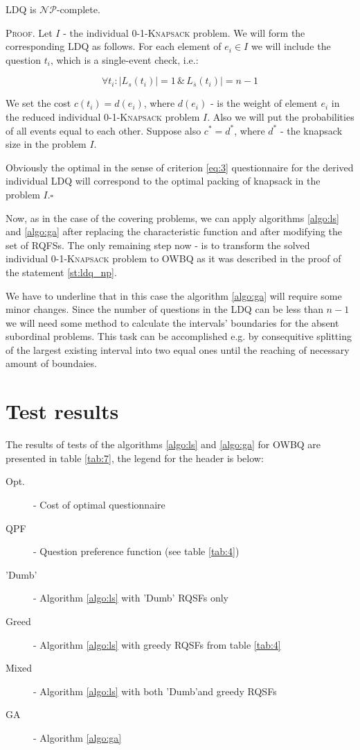 \documentclass[11pt]{article}
\begin{document}
\begin{Mystat} 
LDQ is $\mathcal{NP}$-complete.
\end{Mystat}\label{st:ldq_np}
{\scshape Proof}. Let $I$ - the individual \textsc{0-1-Knapsack} problem. We will form the corresponding LDQ as follows. For each element of $e_i \in I$ we will include the question $t_i$, which is a single-event check, i.e.:

\begin{equation}
\forall t_i : |L_s(t_i)|=1\,\&\,L_{\bar s}(t_i)\mid=n-1 \label{eq:4}
\end{equation}

We set the cost $c(t_i)=d(e_i)$, where $d(e_i)$ - is the weight of element $e_i$ in the reduced individual \textsc{0-1-Knapsack} problem $I$. Also we will put the probabilities of all events equal to each other. Suppose also $c^*=d^*$, where $d^*$ - the knapsack size in the problem $I$.

Obviously the optimal in the sense of criterion \ref{eq:3} questionnaire for the derived individual LDQ will correspond to the optimal packing of knapsack in the problem $I$.$\square$

Now, as in the case of the covering problems, we can apply algorithms \ref{algo:ls} and \ref{algo:ga} after replacing the characteristic function and after modifying the set of RQFSs. The only remaining step now - is to transform the solved individual \textsc{0-1-Knapsack} problem to OWBQ as it was described in the proof of the statement \ref{st:ldq_np}.

We have to underline that in this case the algorithm \ref{algo:ga} will require some minor changes. Since the number of questions in the LDQ can be less than $n-1$ we will need some method to calculate the intervals' boundaries for the absent subordinal problems. This task can be accomplished e.g. by consequitive splitting of the largest existing interval into two equal ones until the reaching of necessary amount of boundaies. 

%
%
%
%
%
%
\section{Test results}
The results of tests of the algorithms \ref{algo:ls} and \ref{algo:ga} for OWBQ are presented in table \ref{tab:7}, the legend for the header is below: 
\renewcommand{\descriptionlabel}[1]{\hspace{\labelsep}\textsf{#1}}
\begin{description}
\item[Opt.] - Cost of optimal questionnaire
\item[QPF] - Question preference function (see table \ref{tab:4})
\item['Dumb'] - Algorithm \ref{algo:ls} with 'Dumb' RQSFs only
\item[Greed] - Algorithm \ref{algo:ls} with greedy RQSFs from table \ref{tab:4} 
\item[Mixed] - Algorithm \ref{algo:ls} with both 'Dumb'and greedy RQSFs
\item[GA] - Algorithm \ref{algo:ga}
\end{description}
\end{document}
